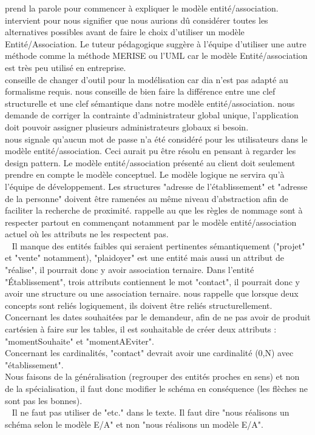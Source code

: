 \documentclass [a4paper] {article}
\begin{document}
\Julie{} prend la parole pour commencer à expliquer le modèle entité/association.
\nomTuteurPedago{} intervient pour nous signifier que nous aurions dû considérer toutes les alternatives possibles avant de  faire le choix d'utiliser un modèle Entité/Association. Le tuteur pédagogique suggère à l'équipe d'utiliser une autre méthode comme la méthode MERISE ou l'UML car le modèle Entité/association est très peu utilisé en entreprise. \\
\nomTuteurPedago{} conseille de changer d'outil pour la modélisation car dia n'est pas adapté au formalisme requis. \nomTuteurPedago{} nous conseille de bien faire la différence entre une clef structurelle et une clef sémantique dans notre modèle entité/association.
\nomTuteurPedago{} nous demande de corriger la contrainte d'administrateur global unique, l'application doit pouvoir assigner plusieurs administrateurs globaux si besoin. \\
\nomTuteurPedago{} nous signale qu'aucun mot de passe n'a été considéré pour les utilisateurs dans le modèle entité/association. Ceci aurait pu être résolu en pensant à regarder les design pattern. 
Le modèle entité/association présenté au client doit seulement prendre en compte le modèle conceptuel. Le modèle logique ne servira qu'à l'équipe de développement. 
Les structures "adresse de l'établissement" et "adresse de la personne" doivent être ramenées au même niveau d'abstraction afin de faciliter la recherche de proximité.
\nomTuteurPedago{} rappelle au \RGC{} que les règles de nommage sont à respecter partout en commençant notamment par le modèle entité/association actuel où les attributs ne les respectent pas.
\\ ~
Il manque des entités faibles qui seraient pertinentes sémantiquement ("projet" et "vente" notamment), "plaidoyer" est une entité mais aussi un attribut de "réalise", il pourrait donc y avoir association ternaire. Dans l'entité "Établissement", trois attributs contiennent le mot "contact", il pourrait donc y avoir une structure ou une association ternaire. \nomTuteurPedago{} nous rappelle que lorsque deux concepts sont reliés logiquement, ils doivent être reliés structurellement. Concernant les dates souhaitées par le demandeur, afin de ne pas avoir de produit cartésien à faire sur les tables, il est souhaitable de créer deux attributs : "momentSouhaite" et "momentAEviter".
\\
Concernant les cardinalités, "contact" devrait avoir une cardinalité (0,N) avec "établissement".
\\
Nous faisons de la généralisation (regrouper des entités proches en sens) et non de la spécialisation, il faut donc modifier le schéma en conséquence (les flèches ne sont pas les bonnes).
\\ ~
Il ne faut pas utiliser de "etc." dans le texte. Il faut dire "nous réalisons un schéma selon le modèle E/A" et non "nous réalisons un modèle E/A".
\end{document}
